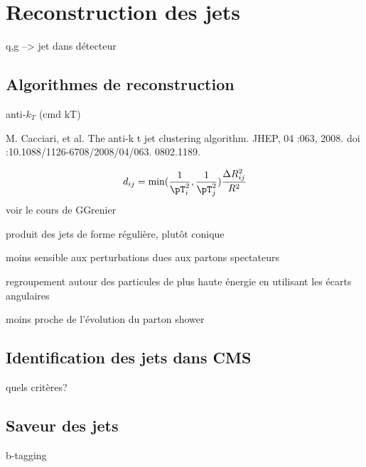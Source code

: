 \section{Reconstruction des jets}

q,g --> jet dans détecteur

\subsection{Algorithmes de reconstruction}

anti-$k_T$ (cmd kT)

M. Cacciari, et al. The anti-k t jet clustering algorithm. JHEP, 04 :063, 2008.
doi :10.1088/1126-6708/2008/04/063. 0802.1189.

\begin{equation}
d_{ij} = \min(\frac{1}{\pT^2_i}, \frac{1}{\pT^2_j}) \frac{\Delta R^2_{ij}}{R^2}
\end{equation}
voir le cours de GGrenier

produit des jets de forme régulière, plutôt conique

moins sensible aux perturbations dues aux partons spectateurs

regroupement autour des particules de plus haute énergie en utilisant les écarts angulaires

moins proche de l'évolution du parton shower

\subsection{Identification des jets dans CMS}
quels critères?

\subsection{Saveur des jets}
b-tagging